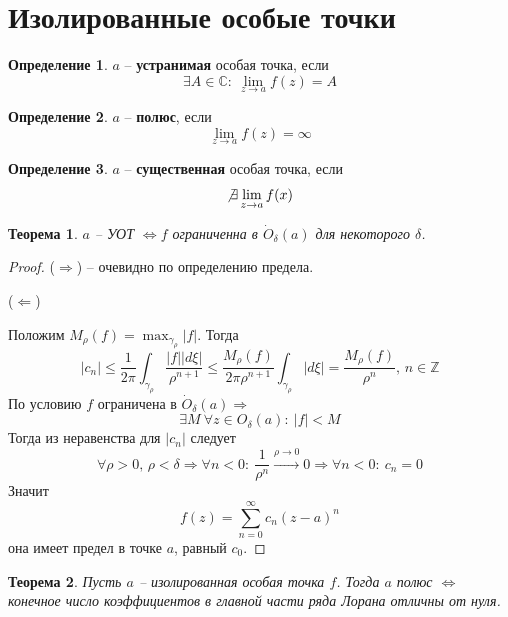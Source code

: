 \documentclass[a4paper,12pt]{article}
\renewcommand{\leq}{\ensuremath{\leqslant}}
\theoremstyle{plain}
\newtheorem{theorem}{Теорема}[section]
\theoremstyle{definition}
\newtheorem{definition}{Определение}[section]
\theoremstyle{remark}
\begin{document}
\section{Изолированные особые точки}
\begin{definition}
	$a$ -- \textbf{устранимая} особая точка, если
	\[
		\exists A \in \mathbb{C} :\: \lim_{z \to a} f(z) = A
	\]
\end{definition}

\begin{definition}
	$a$ -- \textbf{полюс}, если
	\[
		\lim_{z \to a} f(z) = \infty
	\]
\end{definition}

\begin{definition}
	$a$ -- \textbf{существенная} особая точка, если
	\[
		\not\exists \lim_{z \to a}f(x)
	\]
\end{definition}

\begin{theorem}
	$a$ -- УОТ $\Leftrightarrow f$ ограниченна в $\dot{O}_\delta(a)$ для некоторого $\delta$.
\end{theorem}

\begin{proof}
	($\Rightarrow$) -- очевидно по определению предела.

	($\Leftarrow$)

	Положим $M_\rho(f) = \max_{\gamma_\rho}\vert f\vert$. Тогда
	\[
		\vert c_n\vert \leq \frac{1}{2\pi}\int_{\gamma_\rho} \frac{\vert f\vert\vert d\xi\vert}{\rho^{n + 1}} \leq \frac{M_\rho(f)}{2\pi\rho^{n + 1}}\int_{\gamma_\rho}\vert d\xi\vert = \frac{M_\rho(f)}{\rho^n},\, n \in \mathbb{Z}
	\]
	По условию $f$ ограничена в $\dot{O}_\delta(a) \Rightarrow$
	\[
		\exists M \: \forall z \in O_\delta(a) :\: \vert f\vert < M
	\]
	Тогда из неравенства для $\vert c_n\vert$ следует
	\[
		\forall \rho > 0,\, \rho < \delta \Rightarrow \forall n < 0 :\: \frac{1}{\rho^n} \overset{\rho \to 0}{\to} 0 \Rightarrow \forall n < 0 :\: c_n = 0
	\]
	Значит
	\[
		f(z) = \sum_{n = 0}^\infty c_n(z - a)^n
	\]
	она имеет предел в точке $a$, равный $c_0$.
\end{proof}

\begin{theorem}
	Пусть $a$ -- изолированная особая точка $f$. Тогда $a$ полюс $\Leftrightarrow$ конечное число коэффициентов в главной части ряда Лорана отличны от нуля.
\end{theorem}
\end{document}
